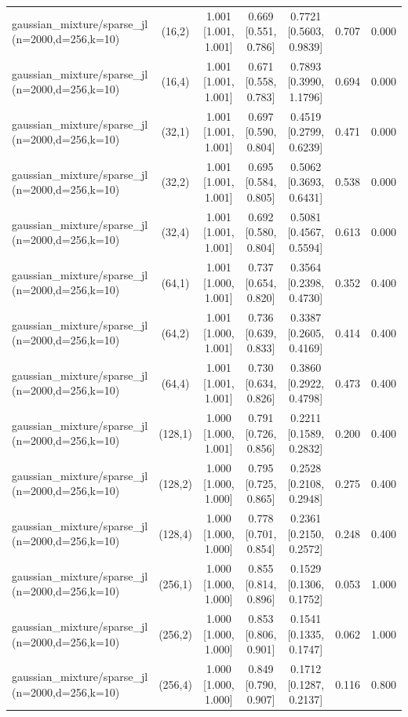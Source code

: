 \begin{tabular}{lcccccc}
gaussian\_mixture/sparse\_jl (n=2000,d=256,k=10) & (16,2) & 1.001 [1.001, 1.001] & 0.669 [0.551, 0.786] & 0.7721 [0.5603, 0.9839] & 0.707 & 0.000 \\
gaussian\_mixture/sparse\_jl (n=2000,d=256,k=10) & (16,4) & 1.001 [1.001, 1.001] & 0.671 [0.558, 0.783] & 0.7893 [0.3990, 1.1796] & 0.694 & 0.000 \\
gaussian\_mixture/sparse\_jl (n=2000,d=256,k=10) & (32,1) & 1.001 [1.001, 1.001] & 0.697 [0.590, 0.804] & 0.4519 [0.2799, 0.6239] & 0.471 & 0.000 \\
gaussian\_mixture/sparse\_jl (n=2000,d=256,k=10) & (32,2) & 1.001 [1.001, 1.001] & 0.695 [0.584, 0.805] & 0.5062 [0.3693, 0.6431] & 0.538 & 0.000 \\
gaussian\_mixture/sparse\_jl (n=2000,d=256,k=10) & (32,4) & 1.001 [1.001, 1.001] & 0.692 [0.580, 0.804] & 0.5081 [0.4567, 0.5594] & 0.613 & 0.000 \\
gaussian\_mixture/sparse\_jl (n=2000,d=256,k=10) & (64,1) & 1.001 [1.000, 1.001] & 0.737 [0.654, 0.820] & 0.3564 [0.2398, 0.4730] & 0.352 & 0.400 \\
gaussian\_mixture/sparse\_jl (n=2000,d=256,k=10) & (64,2) & 1.001 [1.000, 1.001] & 0.736 [0.639, 0.833] & 0.3387 [0.2605, 0.4169] & 0.414 & 0.400 \\
gaussian\_mixture/sparse\_jl (n=2000,d=256,k=10) & (64,4) & 1.001 [1.001, 1.001] & 0.730 [0.634, 0.826] & 0.3860 [0.2922, 0.4798] & 0.473 & 0.400 \\
gaussian\_mixture/sparse\_jl (n=2000,d=256,k=10) & (128,1) & 1.000 [1.000, 1.001] & 0.791 [0.726, 0.856] & 0.2211 [0.1589, 0.2832] & 0.200 & 0.400 \\
gaussian\_mixture/sparse\_jl (n=2000,d=256,k=10) & (128,2) & 1.000 [1.000, 1.000] & 0.795 [0.725, 0.865] & 0.2528 [0.2108, 0.2948] & 0.275 & 0.400 \\
gaussian\_mixture/sparse\_jl (n=2000,d=256,k=10) & (128,4) & 1.000 [1.000, 1.000] & 0.778 [0.701, 0.854] & 0.2361 [0.2150, 0.2572] & 0.248 & 0.400 \\
gaussian\_mixture/sparse\_jl (n=2000,d=256,k=10) & (256,1) & 1.000 [1.000, 1.000] & 0.855 [0.814, 0.896] & 0.1529 [0.1306, 0.1752] & 0.053 & 1.000 \\
gaussian\_mixture/sparse\_jl (n=2000,d=256,k=10) & (256,2) & 1.000 [1.000, 1.000] & 0.853 [0.806, 0.901] & 0.1541 [0.1335, 0.1747] & 0.062 & 1.000 \\
gaussian\_mixture/sparse\_jl (n=2000,d=256,k=10) & (256,4) & 1.000 [1.000, 1.000] & 0.849 [0.790, 0.907] & 0.1712 [0.1287, 0.2137] & 0.116 & 0.800 \\

\end{tabular}
